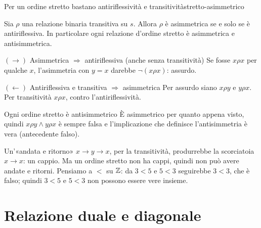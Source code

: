 \begin{concetto}
\begin{Proposizione}{Per un ordine stretto bastano antiriflessività e transitività}{stretto-asimmetrico}
    \begin{prerequisiti}
    \end{prerequisiti}
    Sia $\rho$ una relazione binaria transitiva su $s$. Allora $\rho$ è asimmetrica se e solo se è antiriflessiva.
    In particolare ogni relazione d'ordine stretto è asimmetrica e antisimmetrica.
\end{Proposizione}
\begin{dimostrazione}
    \begin{caso}{$(\rightarrow)$ Asimmetrica $\Rightarrow$ antiriflessiva (anche senza transitività)}
        Se fosse $x \rho x$ per qualche $x$, l'asimmetria con $y = x$ darebbe $\neg(x \rho x)$: assurdo.
    \end{caso}
    \begin{caso}{$(\leftarrow)$ Antiriflessiva e transitiva $\Rightarrow$ asimmetrica}
        Per assurdo siano $x \rho y$ e $y \rho x$. Per transitività $x \rho x$, contro l'antiriflessività.
    \end{caso}
    \begin{caso}{Ogni ordine stretto è antisimmetrico}
        È asimmetrico per quanto appena visto, quindi $x \rho y \wedge y \rho x$ è sempre falsa e l'implicazione che definisce
        l'antisimmetria è vera (antecedente falso).
    \end{caso}
\end{dimostrazione}
\end{concetto}

\begin{spiegazione}
    Un'«andata e ritorno» $x \to y \to x$, per la transitività, produrrebbe la scorciatoia $x \to x$: un cappio. Ma un ordine
    stretto non ha cappi, quindi non può avere andate e ritorni. Pensiamo a $<$ su $\mathbb{Z}$: da $3 < 5$ e $5 < 3$ seguirebbe
    $3 < 3$, che è falso; quindi $3 < 5$ e $5 < 3$ non possono essere vere insieme.
\end{spiegazione}

\section{Relazione duale e diagonale}\label{sec:duale-diagonale}

